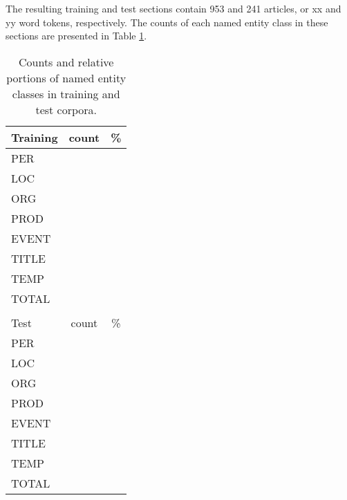 \documentclass[11pt]{article}
\begin{document}
The resulting training and test sections contain 953 and 241 articles, or xx and yy word tokens, respectively. The counts of each named entity class in these sections are presented in Table \ref{tab: statistics}.


\begin{table}[h!]
\begin{center}
\begin{tabular}{lcc} 
\hline
\noalign{\smallskip}
Training & count & \% \\ 
\hline
\noalign{\smallskip}
PER & & \\
LOC & &  \\
ORG & & \\
PROD & & \\
EVENT & & \\
TITLE & & \\
TEMP & & \\
\hline
\noalign{\smallskip}
TOTAL & & \\
& & \\
\hline
\noalign{\smallskip}
Test & count & \% \\ 
\hline
\noalign{\smallskip}
PER & & \\
LOC & &  \\
ORG & & \\
PROD & & \\
EVENT & & \\
TITLE & & \\
TEMP & & \\
\hline
\noalign{\smallskip}
TOTAL & & \\\end{tabular}
\end{center}
\caption{Counts and relative portions of named entity classes in training and test corpora.}
\label{tab: statistics} 
\end{table}



\end{document}
